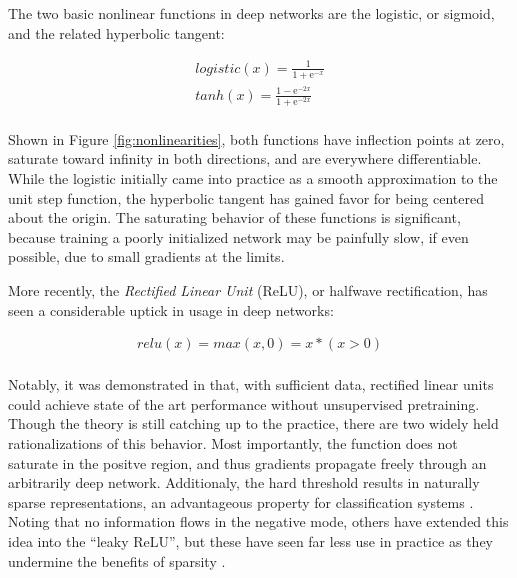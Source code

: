 The two basic nonlinear functions in deep networks are the logistic, or sigmoid, and the related hyperbolic tangent:

\begin{align*}
  logistic(x) = \frac{1}{1 + \mathrm{e}^{-x}} \\
  tanh(x) = \frac{1 - \mathrm{e}^{-2x}} {1 + \mathrm{e}^{-2x}} \\
\end{align*}

Shown in Figure \ref{fig:nonlinearities}, both functions have inflection points at zero, saturate toward infinity in both directions, and are everywhere differentiable.
While the logistic initially came into practice as a smooth approximation to the unit step function, the hyperbolic tangent has gained favor for being centered about the origin.
The saturating behavior of these functions is significant, because training a poorly initialized network may be painfully slow, if even possible, due to small gradients at the limits.

More recently, the \emph{Rectified Linear Unit} (ReLU), or halfwave rectification, has seen a considerable uptick in usage in deep networks:

\begin{align*}
  relu(x) = max(x, 0) = x * (x > 0)\\
\end{align*}

\noindent Notably, it was demonstrated in \cite{Hinton2011} that, with sufficient data, rectified linear units could achieve state of the art performance without unsupervised pretraining.
Though the theory is still catching up to the practice, there are two widely held rationalizations of this behavior.
Most importantly, the function does not saturate in the positve region, and thus gradients propagate freely through an arbitrarily deep network.
Additionaly, the hard threshold results in naturally sparse representations, an advantageous property for classification systems \cite{Goodfellow2012}.
Noting that no information flows in the negative mode, others have extended this idea into the ``leaky ReLU'', but these have seen far less use in practice as they undermine the benefits of sparsity \cite{Ng?}.



